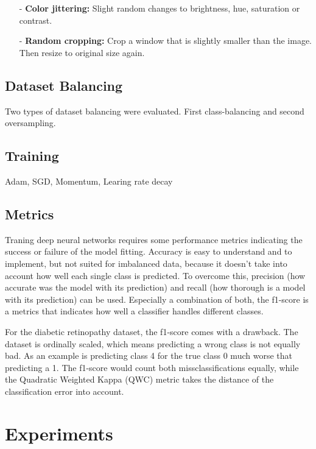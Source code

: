 \documentclass{article}
\begin{document}
\begin{itemize}
\begin{itemize}
\begin{figure}[h]
\begin{minipage}[b]{.5\textwidth}
\begin{center}
          \captionsetup{justification=centering}
          \label{fig:IDRiD_graham}
          \end{center}
      \end{minipage}
  \end{figure} 
  \end{itemize}   
  \item[-] \textbf{Color jittering:} Slight random changes to brightness, hue, saturation or contrast.
  \item[-] \textbf{Random cropping:} Crop a window that is slightly smaller than the image. Then resize to original size again.
\end{itemize}
\subsection{Dataset Balancing}
Two types of dataset balancing were evaluated. First class-balancing and second oversampling.
\subsection{Training}
Adam, SGD, Momentum, Learing rate decay
\subsection{Metrics}
Traning deep neural networks requires some performance metrics indicating the success or failure of the model fitting. Accuracy
is easy to understand and to implement, but not suited for imbalanced data, because it doesn't take into account how well each 
single class is predicted. 
To overcome this, precision (how accurate was the model with its prediction) and recall (how thorough is a model with its prediction) can be used. 
Especially a combination of both, the f1-score is a metrics that indicates how well a classifier handles different classes.

For the diabetic retinopathy dataset, the f1-score comes with a drawback. The dataset is ordinally scaled, which means predicting 
a wrong class is not equally bad. As an example is predicting class 4 for the true class 0 much worse that predicting a 1. The
f1-score would count both missclassifications equally, while the Quadratic Weighted Kappa (QWC) metric takes the distance of 
the classification error into account.
\section{Experiments}
\end{document}
